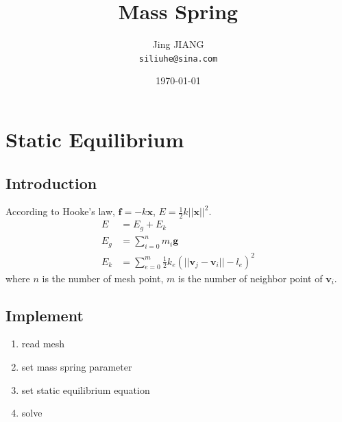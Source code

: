 \documentclass{article}
\title{Mass Spring} %
\author{Jing JIANG\\ \texttt{siliuhe@sina.com}} %
\date{%
  \today} %
\begin{document}
\maketitle %

\section*{Static Equilibrium}
\subsection*{Introduction} %

According to Hooke's law, $\bm{f} = -k\bm{x}$, $E=\frac{1}{2}k{||\bm{x}||}^2$.
\begin{equation*}
  \begin{split}
    E&=E_g+E_k  \\
    E_g&=\sum_{i=0}^{n}m_i\bm{g}  \\
    E_k&=\sum_{e=0}^{m}\frac{1}{2}k_e({||\bm{v}_j-\bm{v}_i||-l_e})^2
  \end{split}
\end{equation*}
where $n$ is the number of mesh point, $m$ is the number of neighbor point of $\bm{v}_i$.
\subsection*{Implement}
\begin{enumerate}
\item read mesh
\item set mass spring parameter
\item set static equilibrium equation
\item solve
\end{enumerate}
\end{document}
